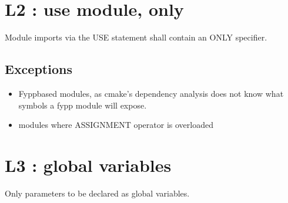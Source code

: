 \documentclass[letterpaper,10pt,english]{sphinxmanual}
\begin{document}
\section{L2 : use module, only}
\label{\detokenize{rules/L2:l2-use-module-only}}\label{\detokenize{rules/L2::doc}}
\sphinxAtStartPar
Module imports via the USE statement shall contain an ONLY specifier.

\sphinxAtStartPar
{}

\begin{sphinxVerbatim}[commandchars=\\\{\}]
\end{sphinxVerbatim}

\sphinxAtStartPar
{}

\begin{sphinxVerbatim}[commandchars=\\\{\}]
\end{sphinxVerbatim}


\subsection{Exceptions}
\label{\detokenize{rules/L2:exceptions}}\begin{itemize}
\item {} 
\sphinxAtStartPar
Fypp\sphinxhyphen{}based modules, as cmake’s dependency analysis does not know what symbols a fypp module will expose.

\item {} 
\sphinxAtStartPar
modules where ASSIGNMENT operator is overloaded

\end{itemize}

\sphinxstepscope


\section{L3 : global variables}
\label{\detokenize{rules/L3:l3-global-variables}}\label{\detokenize{rules/L3::doc}}
\sphinxAtStartPar
Only parameters to be declared as global variables.
\end{document}
